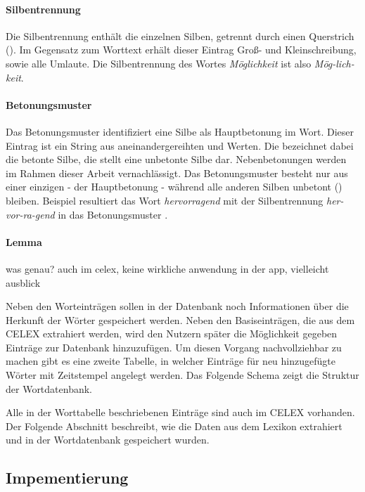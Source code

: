 \paragraph{Silbentrennung}
Die Silbentrennung enthält die einzelnen Silben, getrennt durch einen Querstrich (\qq{-}). Im Gegensatz zum Worttext erhält dieser Eintrag Groß- und Kleinschreibung, sowie alle Umlaute. Die Silbentrennung des Wortes \textit{Möglichkeit} ist also \textit{Mög-lich-keit}.

\paragraph{Betonungsmuster}
Das Betonungsmuster identifiziert eine Silbe als Hauptbetonung im Wort. Dieser Eintrag ist ein String aus aneinandergereihten  und  Werten. Die  bezeichnet dabei die betonte Silbe, die  stellt eine unbetonte Silbe dar. Nebenbetonungen werden im Rahmen dieser Arbeit vernachlässigt. Das Betonungsmuster besteht nur aus einer einzigen  - der Hauptbetonung - während alle anderen Silben unbetont () bleiben. Beispiel resultiert das Wort \textit{hervorragend} mit der Silbentrennung \textit{her-vor-ra-gend} in das Betonungsmuster .

\paragraph{Lemma}
was genau? auch im celex, keine wirkliche anwendung in der app, vielleicht ausblick

Neben den Worteinträgen sollen in der Datenbank noch Informationen über die Herkunft der Wörter gespeichert werden. Neben den Basiseinträgen, die aus dem CELEX extrahiert werden, wird den Nutzern später die Möglichkeit gegeben Einträge zur Datenbank hinzuzufügen. Um diesen Vorgang nachvollziehbar zu machen gibt es eine zweite Tabelle, in welcher Einträge für neu hinzugefügte Wörter mit Zeitstempel angelegt werden. Das Folgende Schema zeigt die Struktur der Wortdatenbank.


Alle in der Worttabelle beschriebenen Einträge sind auch im CELEX vorhanden. Der Folgende Abschnitt beschreibt, wie die Daten aus dem Lexikon extrahiert und in der Wortdatenbank gespeichert wurden.

\subsection{Impementierung}

